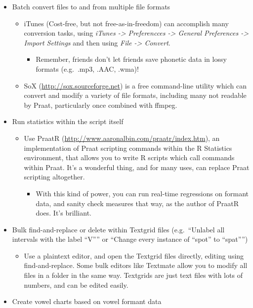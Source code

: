 \begin{itemize}
\tightlist
\item
  Batch convert files to and from multiple file formats

  \begin{itemize}
  \tightlist
  \item
    iTunes (Cost-free, but not free-as-in-freedom) can accomplish many
    conversion tasks, using \emph{iTunes -\textgreater{} Preferencces
    -\textgreater{} General Preferences -\textgreater{} Import Settings}
    and then using \emph{File -\textgreater{} Convert}.

    \begin{itemize}
    \tightlist
    \item
      Remember, friends don't let friends save phonetic data in lossy
      formats (e.g.~.mp3, .AAC, .wma)!
    \end{itemize}
  \item
    SoX (\url{http://sox.sourceforge.net}) is a free command-line
    utility which can convert and modify a variety of file formats,
    including many not readable by Praat, particularly once combined
    with ffmpeg.
  \end{itemize}
\item
  Run statistics within the script itself

  \begin{itemize}
  \tightlist
  \item
    Use PraatR (\url{http://www.aaronalbin.com/praatr/index.htm}), an
    implementation of Praat scripting commands within the R Statistics
    environment, that allows you to write R scripts which call commands
    within Praat. It's a wonderful thing, and for many uses, can replace
    Praat scripting altogether.

    \begin{itemize}
    \tightlist
    \item
      With this kind of power, you can run real-time regressions on
      formant data, and sanity check measures that way, as the author of
      PraatR does. It's brilliant.
    \end{itemize}
  \end{itemize}
\item
  Bulk find-and-replace or delete within Textgrid files (e.g.~``Unlabel
  all intervals with the label ``V'''' or ``Change every instance of
  ``spot'' to ``spat'''')

  \begin{itemize}
  \tightlist
  \item
    Use a plaintext editor, and open the Textgrid files directly,
    editing using find-and-replace. Some bulk editors like Textmate
    allow you to modify all files in a folder in the same way. Textgrids
    are just text files with lots of numbers, and can be edited easily.
  \end{itemize}
\item
  Create vowel charts based on vowel formant data


\end{itemize}
